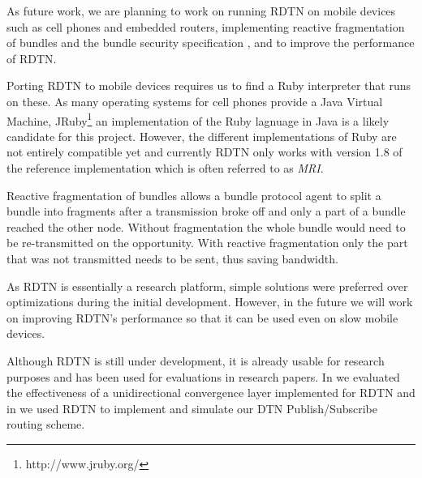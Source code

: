\documentclass{article}
\begin{document}
As future work, we are planning to work on running RDTN on mobile devices such
as cell phones and embedded routers, implementing reactive fragmentation of
bundles and the bundle security specification \cite{bundle-security}, and to
improve the performance of RDTN.

Porting RDTN to mobile devices requires us to find a Ruby interpreter that runs
on these. As many operating systems for cell phones provide a Java Virtual
Machine, JRuby\footnote{http://www.jruby.org/} an implementation of the Ruby
lagnuage in Java is a likely candidate for this project. However, the different
implementations of Ruby are not entirely compatible yet and currently RDTN only
works with version 1.8 of the reference implementation which is often referred
to as {\em MRI}.

Reactive fragmentation of bundles allows a bundle protocol agent to split a
bundle into fragments after a transmission broke off and only a part of a bundle
reached the other node. Without fragmentation the whole bundle would need to be
re-transmitted on the opportunity. With reactive fragmentation only the 
part that was not transmitted needs to be sent, thus saving bandwidth.

As RDTN is essentially a research platform, simple solutions were preferred over
optimizations during the initial development. However, in the future we will
work on improving RDTN's performance so that it can be used even on slow mobile
devices.

Although RDTN is still under development, it is already usable for research
purposes and has been used for evaluations in research papers.  In \cite{nsdr07}
we evaluated the effectiveness of a unidirectional convergence layer implemented
for RDTN and in \cite{dtn-pubsub} we used RDTN to implement and simulate our DTN
Publish/Subscribe routing scheme.


\end{document}
